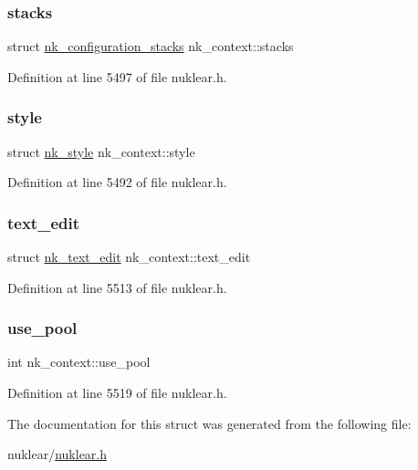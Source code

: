 \mbox{\label{structnk__context_a86bc92d9133c81f3dd85c8ae99d612dc}} 
\subsubsection{\texorpdfstring{stacks}{stacks}}
{\footnotesize\ttfamily struct \mbox{\hyperlink{structnk__configuration__stacks}{nk\+\_\+configuration\+\_\+stacks}} nk\+\_\+context\+::stacks}



Definition at line 5497 of file nuklear.\+h.

\mbox{\label{structnk__context_a39208175c061b8486ee8fb51e50a243e}} 
\subsubsection{\texorpdfstring{style}{style}}
{\footnotesize\ttfamily struct \mbox{\hyperlink{structnk__style}{nk\+\_\+style}} nk\+\_\+context\+::style}



Definition at line 5492 of file nuklear.\+h.

\mbox{\label{structnk__context_aca8a2124af97661372f7b35d636c9bc6}} 
\subsubsection{\texorpdfstring{text\+\_\+edit}{text\_edit}}
{\footnotesize\ttfamily struct \mbox{\hyperlink{structnk__text__edit}{nk\+\_\+text\+\_\+edit}} nk\+\_\+context\+::text\+\_\+edit}



Definition at line 5513 of file nuklear.\+h.

\mbox{\label{structnk__context_a10afb1419df73de41b2be1d0bff8523c}} 
\subsubsection{\texorpdfstring{use\+\_\+pool}{use\_pool}}
{\footnotesize\ttfamily int nk\+\_\+context\+::use\+\_\+pool}



Definition at line 5519 of file nuklear.\+h.



The documentation for this struct was generated from the following file\+:\begin{DoxyCompactItemize}
\item 
nuklear/\mbox{\hyperlink{nuklear_8h}{nuklear.\+h}}\end{DoxyCompactItemize}
